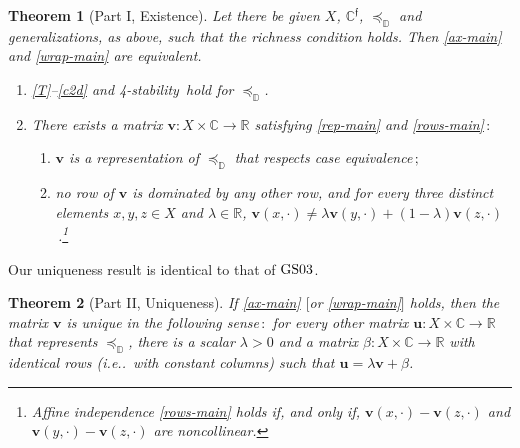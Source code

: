 \documentclass[ecta,nameyear,draft]{econsocart}
\makeatletter
\newcommand{\R}{\mathbb R}
\newcommand{\novel}{\mathfrak f}
\newcommand{\preceqb}{\mathbin{\preceq}}
\newcommand{\mbbd}{{\mathds D}}
\newcommand{\mbbc}{{\mathds C}}
\newcommand{\mbbcp}{{\mathds C^{\novel}}}
\newcommand{\mbbt}{{\mathds {T}}}
\newcommand{\stability}{\textit{4}-\textup{{stability}}}
\newcommand\ie{i\@.e\@ifnextchar.{}{.\@}}
\newcommand{\gsii}{$\textup{GS03}$}
\theoremstyle{plain}
\newtheorem{theorem}{Theorem}%
\theoremstyle{remark}
\makeatother
\begin{document}
\begin{theorem}[Part I, Existence]\label{thm-main} Let there be given $X$,
  $\mbbcp$, $\preceqb_ \mbbd$ and {generalization}s, as above, such that the
  richness condition holds. Then \ref{ax-main} and \ref{wrap-main} are
  equivalent.
  \begin{enumerate}[label=\textup{(\ref{thm-main}.\roman*)}]
    \item\label{ax-main} \ref{T}--\ref{c2d} and \stability\ hold for
      $\preceq_{\mbbd}$.
    \item\label{wrap-main} There exists a matrix $\mathbf{v} : X \times \mbbc
      \rightarrow \R$ satisfying \ref{rep-main} and \ref{rows-main}$\,:$
      \begin{enumerate}[label=\textup{(\ref{thm-main}.\alph*)}]
        \item\label{rep-main} $\mathbf{v}$ is a representation of
          $\preceq_{\mbbd}$ that respects case equivalence$\,;$
        \item\label{rows-main} no row of $\mathbf{v}$ is dominated by any other
          row, and for every three distinct elements $x,y, z \in X$ and
          $\lambda \in \R$, $\mathbf{v} (x, \cdot) \neq \lambda
          \mathbf{v}(y,\cdot) + (1-\lambda)
          \mathbf{v}(z,\cdot)$\,.\footnote{Affine independence \ref{rows-main}
            holds if, and only if, $\mathbf{v}(x,\cdot)- \mathbf{v}(z,\cdot)$
          and $\mathbf{v}(y,\cdot)-\mathbf{v}(z,\cdot)$ are noncollinear.}
      \end{enumerate}
  \end{enumerate}
\end{theorem}
Our uniqueness result is identical to that of \gsii.  \setcounter{theorem}{0}
\begin{theorem}[Part II, Uniqueness]%
  If \ref{ax-main} $[$or \ref{wrap-main}$]$ holds, then the matrix $\mathbf{v}$
  is unique in the following sense$\,:$ for every other matrix $\mathbf{u} : X
  \times \mbbc \rightarrow \R$ that represents $\preceqb_{\mbbd}$, there is a
  scalar $\lambda > 0$ and a matrix $\beta : X \times \mbbc \rightarrow \R$
  with identical rows (\ie\ with constant columns) such that $\mathbf{u} =
  \lambda \mathbf{v} + \beta$.
\end{theorem}

\end{document}
